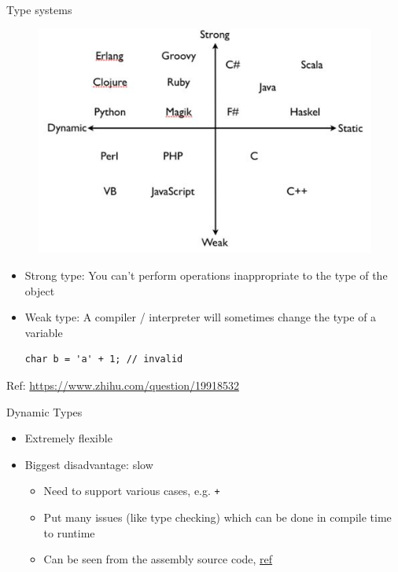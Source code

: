 \documentclass{../TexTemplate/myslide}
\begin{document}
\begin{frame}[fragile]{Type systems}
\begin{figure}
\centering
\includegraphics[width=0.4\linewidth]{fig/PL_types.jpg}
\end{figure}
\small
\begin{itemize}
	\item Strong type: You can't perform operations inappropriate to the type of the object
	\item Weak type: A compiler / interpreter will sometimes change the type of a variable
\begin{lstlisting}
char b = 'a' + 1; // invalid
\end{lstlisting}
\end{itemize}
\small * Ref: \url{https://www.zhihu.com/question/19918532}
\end{frame}

\begin{frame}[fragile]{Dynamic Types}
\begin{itemize}
\item Extremely flexible
\item Biggest disadvantage: slow
\begin{itemize}
	\item Need to support various cases, e.g. \verb'+'
	\item Put many issues (like type checking) which can be done in compile time to runtime
	\item Can be seen from the assembly source code, \href{https://www.zhihu.com/question/25307289/answer/104643646}{ref}
\end{itemize}
\end{itemize}
\end{frame}
\end{document}
